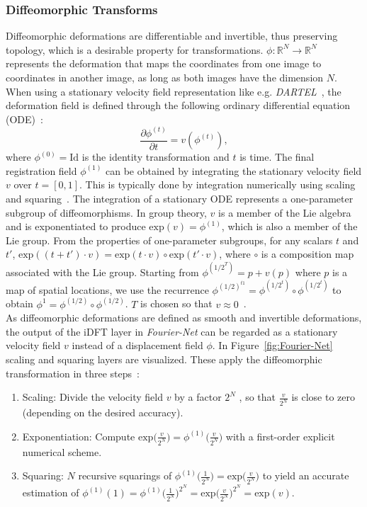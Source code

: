 \subsubsection{Diffeomorphic Transforms} \label{SubSubSec:DiffeomorphicTransforms}
Diffeomorphic deformations are differentiable and invertible, thus preserving topology, which is a desirable property for transformations. $\phi: \mathbb{R}^N \rightarrow \mathbb{R}^N$ represents the deformation that maps the coordinates from one image to coordinates in another image, as long as both images have the dimension $N$. When using a stationary velocity field representation like e.g. \emph{DARTEL}~\cite{DARTEL}, the deformation field is defined through the following ordinary differential equation (ODE)~\cite{Dalca2018}:
\begin{equation}
	\frac{\partial \phi^{(t)}}{\partial t} = v(\phi^{(t)}),
\end{equation}
where $\phi^{(0)} = \text{Id}$ is the identity transformation and $t$ is time. The final registration field $\phi^{(1)}$ can be obtained by integrating the stationary velocity field $v$ over $t = [0, 1]$. This is typically done by integration numerically using scaling and squaring~\cite{ScaleAndSquare}. The integration of a stationary ODE represents a one-parameter subgroup of diffeomorphisms. In group theory, $v$ is a member of the Lie algebra and is exponentiated to produce $\text{exp}(v) = \phi^{(1)}$, which is also a member of the Lie group. From the properties of one-parameter subgroups, for any scalars $t$ and $t'$, $\text{exp}((t + t') \cdot v) = \text{exp}(t \cdot v) \circ \text{exp}(t' \cdot v)$, where $\circ$ is a composition map associated with the Lie group. Starting from $\phi^{({1/2}^T)} = p + v(p)$ where $p$ is a map of spatial locations, we use the recurrence $\phi^{({1/2})^{t  1}} = \phi^{({1/2}^t)} \circ \phi^{({1/2}^t)}$ to obtain $\phi^1 = \phi^{(1/2)} \circ \phi^{(1/2)}$. $T$ is chosen so that $v \approx 0$~\cite{Dalca2018}. \\
As diffeomorphic deformations are defined as smooth and invertible deformations, the output of the iDFT layer in \emph{Fourier-Net} can be regarded as a stationary velocity field $v$ instead of a displacement field $\phi$. In Figure~\ref{fig:Fourier-Net} scaling and squaring layers are visualized. These apply the diffeomorphic transformation in three steps~\cite{ScaleAndSquare}:
\begin{enumerate}
	\item Scaling: Divide the velocity field $v$ by a factor $2^N$ , so that $\frac{v}{2^N}$ is close to zero (depending on the desired accuracy).
	\item Exponentiation: Compute $\text{exp}\big(\frac{v}{2^N}\big) = \phi^{(1)}\big(\frac{v}{2^N}\big)$ with a first-order explicit numerical scheme.
	\item Squaring: $N$ recursive squarings of $\phi^{(1)}\big(\frac{1}{2^N}\big) = \text{exp}\big(\frac{v}{2^N}\big)$ to yield an accurate estimation of $\phi^{(1)}(1) = \phi^{(1)}\big(\frac{1}{2^N}\big)^{2^N} = \text{exp}\big(\frac{v}{2^N}\big)^{2^N} = \text{exp}(v)$.
\end{enumerate}
